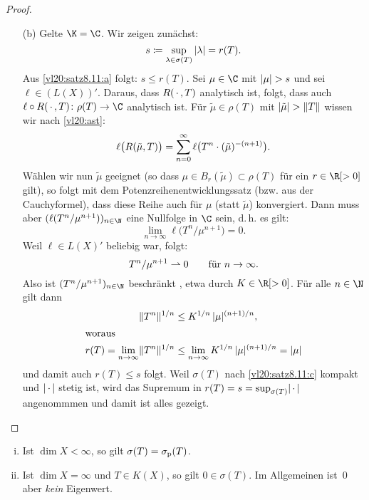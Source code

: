 \begin{proof}
\begin{enumerate}[(a)]
        \item[(b)]
            Gelte $\K=\C$. Wir zeigen zunächst:
            \[ %
                s \defeq \sup_{\lambda\in\sigma(T)}\,\abs\lambda = r(T)
            . \]
            Aus \ref{vl20:satz8.11:a} folgt: $s \leq r(T)$. 
            Sei $\mu\in\C$ mit $\abs\mu > s$ und sei $\ell\in (L(X))'$.
            Daraus, dass $R(\scdot,T)$ analytisch ist, folgt, dass auch
            $\ell\circ R(\scdot,T)\colon \rho(T)\to\C$ analytisch ist. Für
            $\tilde\mu\in\rho(T)$ mit $\abs{\tilde\mu} > \norm{T}$ wissen wir nach
            \eqref{vl20:ast}:
            \[ \ell\bigl(R(\tilde\mu,T)\bigr)
                = \nsum[0]^\infty \ell\bigl(T^n \cdot (\tilde\mu)^{-(n+1)}\bigr)
            . \]
            Wählen wir nun $\tilde\mu$ geeignet (so dass $\mu\in B_r(\tilde\mu)
            \subset\rho(T)$ für ein $r\in\R[>0]$ gilt), so folgt mit dem
            Potenzreihenentwicklungssatz (bzw. aus der Cauchyformel), dass diese
            Reihe auch für $\mu$ (statt $\tilde\mu$) konvergiert. Dann muss aber
            $(\ell(T^n / \mu^{n+1}))_{n\in\N}$ eine Nullfolge in $\C$ sein,
            d.\,h. es gilt:
            \[ \lim_{n\to\infty} \ell\bigl(T^n / \mu^{n+1}\bigr) = 0  . \]
            Weil $\ell\in L(X)'$ beliebig war, folgt:
            \[ T^n / \mu^{n+1} \weakto 0 \fuer n\to\infty  . \]
            Also ist $(T^n/\mu^{n+1})_{n\in\N}$ beschränkt
            , etwa durch $K\in\R[>0]$.
            Für alle $n\in\N$ gilt dann
            \begin{align*}
                \norm{T^n}^{1/n} &\leq K^{1/n} \, \abs{\mu}^{(n+1)/n}  , 
                \\ \shortintertext{woraus}
                r(T) = \lim_{n\to\infty} \norm{T^n}^{1/n} 
                &\leq \lim_{n\to\infty} K^{1/n} \, \abs{\mu}^{(n+1)/n} =\abs{\mu}
            \end{align*}
            und damit auch $r(T) \leq s$ folgt.
            Weil $\sigma(T)$ nach \ref{vl20:satz8.11:c} kompakt und
            $\abs{\scdot}$ stetig ist, wird das Supremum in 
            $r(T) = s = \sup_{\sigma(T)} \abs\scdot$ angenommmen und damit ist alles
            gezeigt.
    \end{enumerate}
\end{proof}

\begin{thBemerkungen}\label{vl19:bem8.12}\hfill
    \begin{enumerate}[(i)]
        \item \label{vl19:bem8.12:i}
            Ist $\dim X < \infty$, so gilt $\sigma(T) = \sigmap(T)$.
            
        \item \label{vl19:bem8.12:ii}
            Ist $\dim X = \infty$ und $T\in K(X)$, so gilt $0\in\sigma(T)$.
            Im Allgemeinen ist~$0$ aber \emph{kein} Eigenwert.
    \end{enumerate}
\end{thBemerkungen}

